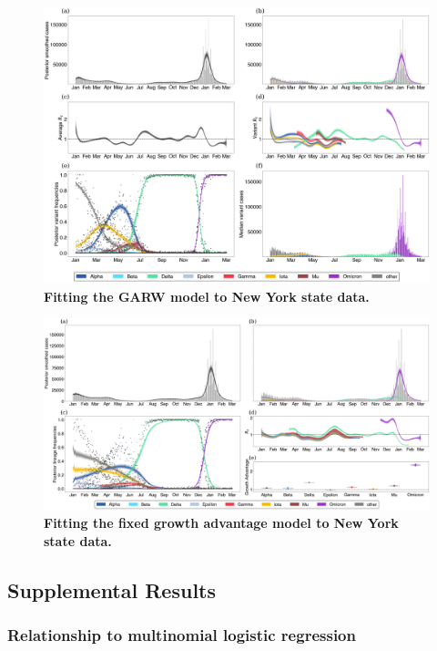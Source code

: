 \documentclass[11pt,oneside,letterpaper]{article}
\begin{document}
\begin{figure}
  \centering
  \includegraphics[width=\linewidth]{figs/GARW_rt_New-York.png}
  \caption{\textbf{Fitting the GARW model to New York state data.}}%
  \label{fig:GARW_rt_New-York}
\end{figure}

\begin{figure}
  \centering
  \includegraphics[width=\linewidth]{figs/fixed_growth_New-York.png}
  \caption{\textbf{Fitting the fixed growth advantage model to New York state data.}}%
  \label{fig:fixed_growth_New-York}
\end{figure}

\clearpage 

\subsection*{Supplemental Results}

\subsubsection*{Relationship to multinomial logistic regression}
\end{document}
